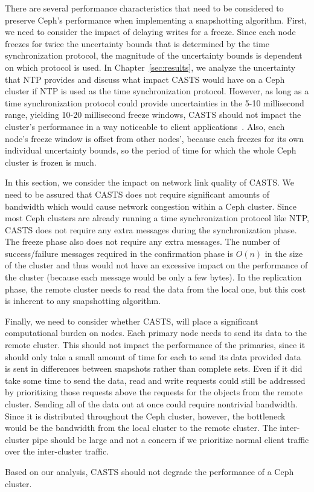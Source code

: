 There are several performance characteristics that need to be
considered to preserve Ceph's performance when implementing a
snapshotting algorithm. First, we need to consider the impact of
delaying writes for a freeze. Since each node freezes for twice the
uncertainty bounds that is determined by the time synchronization
protocol, the magnitude of the uncertainty bounds is dependent on
which protocol is used. In Chapter~\ref{sec:results}, we analyze the
uncertainty that NTP provides and discuss what impact CASTS would have
on a Ceph cluster if NTP is used as the time synchronization
protocol. However, as long as a time synchronization protocol could
provide uncertainties in the 5-10 millisecond range, yielding 10-20
millisecond freeze windows, CASTS should not impact the
cluster's performance in a way noticeable to client
applications~\parencite{Sage}. Also, each node's freeze window is
offset from other nodes', because each freezes for its own individual
uncertainty bounds, so the period of time for which the whole Ceph cluster is
frozen is much.

In this section, we consider the impact on network link quality of
CASTS. We need to be assured that CASTS does not
require significant amounts of bandwidth which would cause network
congestion within a Ceph cluster. Since most Ceph clusters are already
running a time synchronization protocol like NTP, CASTS does
not require any extra messages during the synchronization phase. The
freeze phase also does not require any extra messages. The number of
success/failure messages required in the confirmation phase is $O(n)$
in the size of the cluster and thus would not have an excessive impact
on the performance of the cluster (because each message would be only
a few bytes). In the replication phase, the remote cluster needs to
read the data from the local one, but this cost is inherent to any
snapshotting algorithm.

Finally, we need to consider whether CASTS, will place a significant
computational burden on nodes. Each primary node needs to send its
data to the remote cluster. This should not impact the performance of
the primaries, since it should only take a small amount of time for
each to send its data provided data is sent in differences between
snapshots rather than complete sets. Even if it did take some time to
send the data, read and write requests could still be addressed by
prioritizing those requests above the requests for the objects from
the remote cluster. Sending all of the data out at once could require
nontrivial bandwidth. Since it is distributed throughout the Ceph
cluster, however, the bottleneck would be the bandwidth from the local
cluster to the remote cluster. The inter-cluster pipe should be
large and not a concern if we prioritize normal client traffic over
the inter-cluster traffic.

Based on our analysis, CASTS should not degrade the
performance of a Ceph cluster.
